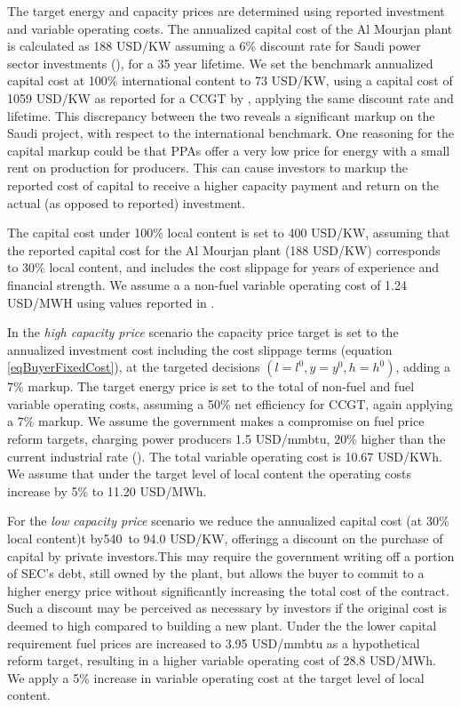 \documentclass[informs]{informs3}
\begin{document}
The target energy and capacity prices are determined using reported investment and variable operating costs. The annualized capital cost of the Al Mourjan plant is calculated as 188 USD/KW assuming a 6\% discount rate for Saudi power sector investments (\citealp{Matar_et_al_2016}), for a 35 year lifetime. We set the benchmark annualized capital cost at 100\% international content to 73 USD/KW, using a capital cost of 1059 USD/KW as reported for a CCGT by \cite{Rioux_et_al_2017}, applying the same discount rate and lifetime. This discrepancy between the two reveals a significant markup on the Saudi project, with respect to the international benchmark. One reasoning for the capital markup could be that PPAs offer a very low price for energy with a small rent on production for producers. This can cause investors to markup the reported cost of capital to receive a higher capacity payment and return on the actual (as opposed to reported) investment. 

The capital cost under 100\% local content is set to 400 USD/KW, assuming that the reported capital cost for the Al Mourjan plant (188 USD/KW) corresponds to 30\%  local content, and includes the cost slippage for years of experience and financial strength. We assume a a non-fuel variable operating cost of 1.24 USD/MWH using values reported in \cite{Rioux_et_al_2017}.

In the \textit{high capacity price} scenario the capacity price target is set to the annualized investment cost including the cost slippage terms (equation \ref{eqBuyerFixedCost}), at the targeted decisions $(l=l^{0}, y=y^{0}, h=h^{0})$,  adding a $7\%$ markup. The target energy price is set to the total of non-fuel and fuel variable operating costs, assuming a 50\% net efficiency for CCGT, again applying a $7\%$ markup.  We assume the government makes a compromise on fuel price reform targets, charging power producers 1.5 USD/mmbtu, $20\%$ higher than the current industrial rate (\citealp{Fattouh_2018}). The total variable operating cost is 10.67 USD/KWh. We assume that under the target level of local content the operating costs increase by 5\% to 11.20 USD/MWh.

For the \textit{low capacity price} scenario we reduce the annualized capital cost (at 30\% local content)t by540\ to 94.0 USD/KW, offeringg a discount on the purchase of capital by private investors.This may require the government writing off a portion of SEC’s debt, still owned by the plant, but allows the buyer to commit to a higher energy price without significantly increasing the total cost of the contract.  Such a discount may be perceived as necessary by investors if the original cost is deemed to high compared to building a new plant. Under the the lower capital requirement fuel prices are increased to 3.95 USD/mmbtu as a hypothetical reform target, resulting in a higher variable operating cost of 28.8 USD/MWh. We apply a 5\% increase in variable operating cost at the target level of local content.
\end{document}

